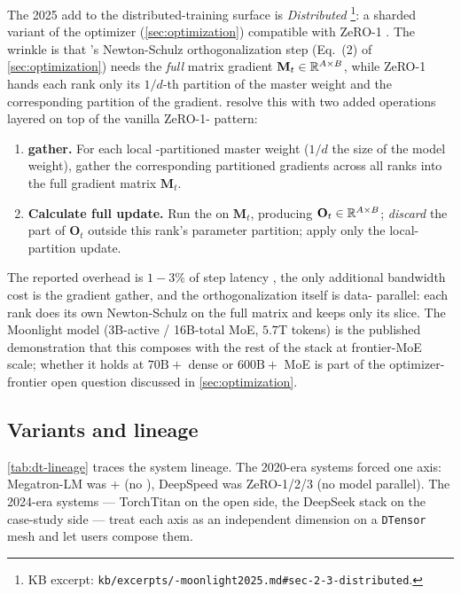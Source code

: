 The 2025 add to the distributed-training surface is \emph{Distributed
} \citep[\S 2.3]{muon-moonlight2025}\footnote{KB excerpt:
\texttt{kb/excerpts/-moonlight2025.md\#sec-2-3-distributed}.}: a
sharded variant of the  optimizer (\cref{sec:optimization})
compatible with ZeRO-1 . The wrinkle is that 's Newton-Schulz
orthogonalization step (Eq.~(2) of \cref{sec:optimization}) needs the
\emph{full} matrix gradient $\mathbf{M}_t \in \mathbb{R}^{A \times B}$, while
ZeRO-1 hands each rank only its
$1/d$-th partition of the master weight and the corresponding
partition of the gradient. \citet[\S 2.3]{muon-moonlight2025} resolve
this with two added operations layered on top of the vanilla
ZeRO-1- pattern:
\begin{enumerate}
\item \textbf{ gather.} For each local -partitioned master weight
($1/d$ the size of the model weight), gather the corresponding
partitioned gradients across all  ranks into the full gradient matrix
$\mathbf{M}_t$.
\item \textbf{Calculate full update.} Run the 
on $\mathbf{M}_t$, producing $\mathbf{O}_t \in \mathbb{R}^{A \times B}$;
\emph{discard} the part of $\mathbf{O}_t$ outside this rank's parameter
partition; apply only the local-partition update.
\end{enumerate}
The reported overhead is $1\!-\!3\%$ of step latency
\citep[\S 2.3]{muon-moonlight2025}, the only additional bandwidth cost
is the gradient gather, and the orthogonalization itself is data-
parallel: each rank does its own Newton-Schulz on the full matrix and
keeps only its slice. The Moonlight model (3B-active / 16B-total MoE,
$5.7\text{T}$ tokens) is the published demonstration that this
composes with the rest of the stack at frontier-MoE scale; whether it
holds at $70\text{B}{+}$ dense or $600\text{B}{+}$ MoE is part of the
optimizer-frontier open question discussed in \cref{sec:optimization}.

\subsection{Variants and lineage}
\label{sec:dt-lineage}

\cref{tab:dt-lineage} traces the system lineage. The 2020-era systems
forced one axis: Megatron-LM was + (no ), DeepSpeed was
ZeRO-1/2/3 (no model parallel). The 2024-era systems --- TorchTitan
\citep{torchtitan2024} on the open side, the DeepSeek stack
\citep{deepseek-v3} on the case-study side --- treat each axis as an
independent dimension on a \texttt{DTensor} mesh and let users compose
them.

